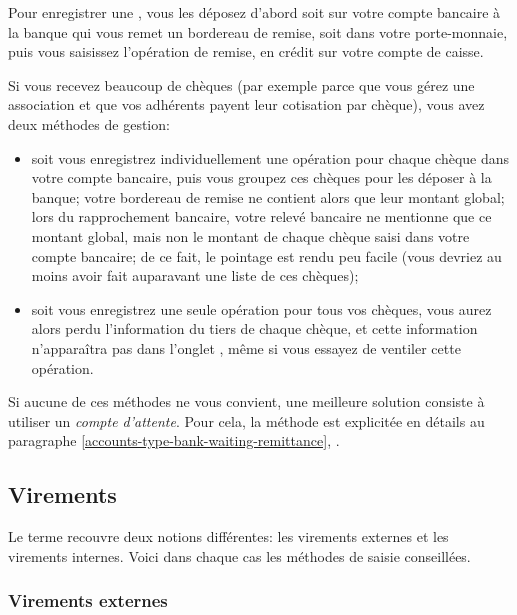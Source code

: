 Pour enregistrer une , vous les déposez d'abord soit sur votre compte bancaire à la banque qui vous remet un bordereau de remise, soit dans votre porte-monnaie, puis vous saisissez l'opération de remise, en crédit sur votre compte de caisse.

Si vous recevez beaucoup de chèques (par exemple parce que vous gérez une association et que vos adhérents payent leur cotisation par chèque), vous avez deux méthodes de gestion:

\begin{itemize}
	\item soit vous enregistrez individuellement une opération pour chaque chèque dans votre compte bancaire, puis vous groupez ces chèques pour les déposer à la banque; votre bordereau de remise ne contient alors que leur montant global; lors du rapprochement bancaire, votre relevé bancaire ne mentionne que ce montant global, mais non le montant de chaque chèque saisi dans votre compte bancaire; de ce fait, le pointage est rendu peu facile (vous devriez au moins avoir fait auparavant une liste de ces chèques);
	\item soit vous enregistrez une seule opération pour tous vos chèques, vous aurez alors perdu l'information du tiers de chaque chèque, et cette information n'apparaîtra pas dans l'onglet , même si vous essayez de ventiler cette opération.
\end{itemize} 

Si aucune de ces méthodes ne vous convient, une meilleure solution consiste à utiliser un \emph{compte d'attente}. Pour cela, la méthode est explicitée en détails au paragraphe \vref{accounts-type-bank-waiting-remittance}, .


\subsection{Virements\label{transactions-new-transfer}}

Le terme  recouvre deux notions différentes: les virements externes et les virements internes. Voici dans chaque cas les méthodes de saisie conseillées.


\subsubsection{Virements externes\label{transactions-new-transfer-external}}

